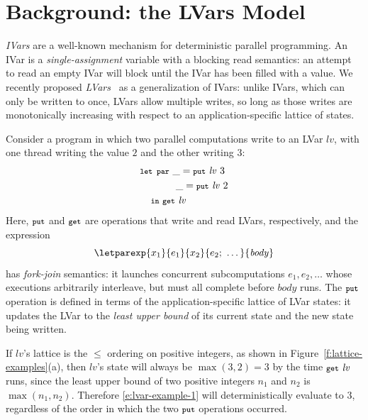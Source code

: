\section{Background: the LVars Model}\label{section:lvars-refresher}

\emph{IVars} \cite{IStructures, id, CnC, monad-par} are a well-known mechanism
for deterministic parallel programming.  An IVar is a \emph{single-assignment}
variable \cite{Tesler-1968} with a blocking read semantics: an attempt to read an
empty IVar will block until the IVar has been filled with a value.  We recently
proposed \emph{LVars}~\cite{LVars-paper} as a generalization of IVars: unlike
IVars, which can only be written to once, LVars allow multiple writes, so long
as those writes are monotonically increasing with respect to an
application-specific lattice of states.

Consider a program in which two parallel computations write to an
 LVar $\mathit{lv}$, with one thread writing the
value $2$ and the other writing $3$:
\begin{equation}
\begin{split}
& \mbox{\footnotesize \texttt{\mbox{\footnotesize \texttt{let}}~\mbox{\footnotesize \texttt{par}}}} ~\_ = \mbox{\footnotesize \texttt{put}}~\mathit{lv}~3 \\
&  \hspace{3.3em} ~\_ = \mbox{\footnotesize \texttt{put}}~\mathit{lv}~2 \\
&  \hspace{1.1em} \mbox{\footnotesize \texttt{in}}~ \mbox{\footnotesize \texttt{get}}~\mathit{lv}
\end{split}
\label{e:lvar-example-1}
\end{equation}
Here, $\mbox{\footnotesize \texttt{put}}$ and $\mbox{\footnotesize \texttt{get}}$ are operations that write and read LVars,
respectively, and the expression
\[ \letparexp{x_1}{e_1}{x_2}{e_2;~\dots}{\mathit{body}} \]
has \emph{fork-join} semantics: it launches concurrent subcomputations $e_1, e_2,
\dots$ whose executions arbitrarily interleave, but must all complete before
$\mathit{body}$ runs.  The $\mbox{\footnotesize \texttt{put}}$ operation is defined in terms of the
application-specific lattice of LVar states: it updates the LVar to the \emph{least
  upper bound} of its current state and the new state being written.

If $\mathit{lv}$'s lattice is the $\leq$ ordering on positive
integers, as shown in Figure~\ref{f:lattice-examples}(a), then
$\mathit{lv}$'s state will always be $\max(3, 2) = 3$ by the time
$\mbox{\footnotesize \texttt{get}}~\mathit{lv}$ runs, since the least upper bound of two positive
integers $n_1$ and $n_2$ is $\max(n_1, n_2)$.  Therefore
\ref{e:lvar-example-1} will deterministically evaluate to $3$,
regardless of the order in which the two $\mbox{\footnotesize \texttt{put}}$ operations occurred.

